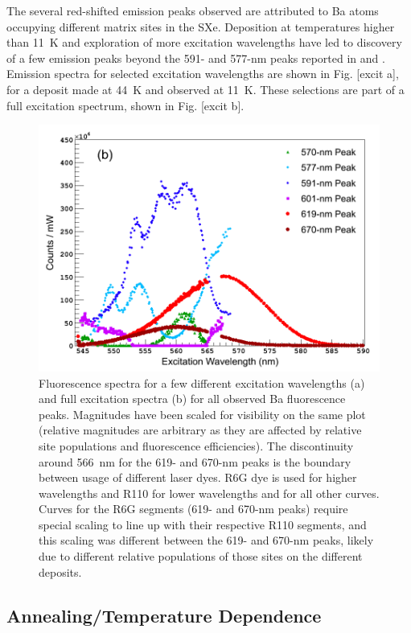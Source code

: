 The several red-shifted emission peaks observed are attributed to Ba atoms occupying different matrix sites in the SXe.  Deposition at temperatures higher than 11~K and exploration of more excitation wavelengths have led to discovery of a few emission peaks beyond the 591- and 577-nm peaks reported in \cite{Shon} and \cite{Brian}.  Emission spectra for selected excitation wavelengths are shown in Fig. [excit a], for a deposit made at 44~K and observed at 11~K.  These selections are part of a full excitation spectrum, shown in Fig. [excit b].

\begin{figure} %
        \centering
                \includegraphics[width=.7\textwidth]{figures/excitspec_grn.png}
                \caption{{\color{red}Fluorescence spectra for a few different excitation wavelengths (a)} and full excitation spectra (b) for all observed Ba fluorescence peaks.  Magnitudes have been scaled for visibility on the same plot (relative magnitudes are arbitrary as they are affected by relative site populations and fluorescence efficiencies).  The discontinuity around 566~nm for the 619- and 670-nm peaks is the boundary between usage of different laser dyes.  R6G dye is used for higher wavelengths and R110 for lower wavelengths and for all other curves.  Curves for the R6G segments (619- and 670-nm peaks) require special scaling to line up with their respective R110 segments, and this scaling was different between the 619- and 670-nm peaks, likely due to different relative populations of those sites on the different deposits.}
\label{fig:excitspecGrn}
\end{figure}

\subsection{Annealing/Temperature Dependence}
\label{subsec:tempanneal}

